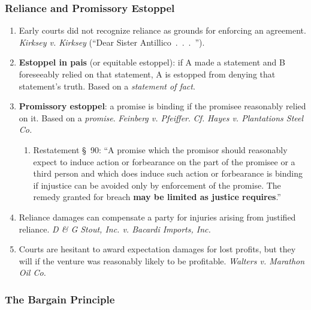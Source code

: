 \subsubsection{Reliance and Promissory Estoppel}

\begin{enumerate}
    \item Early courts did not recognize reliance as grounds for enforcing an 
    agreement. \emph{Kirksey v. Kirksey} (``Dear Sister Antillico~.~.~.~'').
    \item \textbf{Estoppel in pais} (or equitable estoppel): if A made a 
    statement and B foreseeably relied on that statement, A is estopped from 
    denying that statement's truth. Based on a \emph{statement of fact}.
    \item \textbf{Promissory estoppel}: a promise is binding if the promisee 
    reasonably relied on it. Based on a \emph{promise}. \emph{Feinberg v. 
    Pfeiffer}. \emph{Cf.} \emph{Hayes v. Plantations Steel Co.}
    \begin{enumerate}
        \item Restatement \S\ 90: ``A promise which the promisor should 
        reasonably expect to induce action or forbearance on the part of the 
        promisee or a third person and which does induce such action or 
        forbearance is binding if injustice can be avoided only by enforcement 
        of the promise. The remedy granted for breach \textbf{may be limited 
        as justice requires}.''
    \end{enumerate}
    \item Reliance damages can compensate a party for injuries arising from 
    justified reliance. \emph{D \& G Stout, Inc. v. Bacardi Imports, Inc.}
    \item Courts are hesitant to award expectation damages for lost profits, 
    but they will if the venture was reasonably likely to be profitable. 
    \emph{Walters v. Marathon Oil Co.}
\end{enumerate}

\subsubsection{The Bargain Principle}

